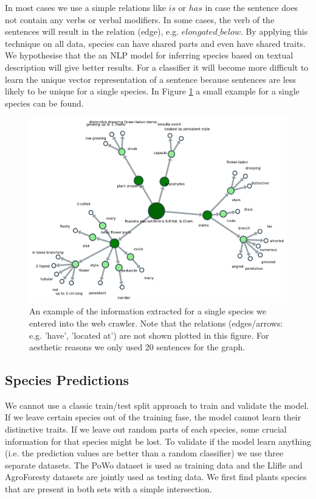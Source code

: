 \documentclass[a4paper, 12pt, oneside]{book} %
\begin{document}
In most cases we use a simple relations like $is$ or $has$ in case the sentence does not contain any verbs or verbal modifiers.
In some cases, the verb of the sentences will result in the relation (edge), e.g. $elongated\_below$.
By applying this technique on all data, species can have shared parts and even have shared traits.
We hypothesise that the an NLP model for inferring species based on textual description will give better results.
For a classifier it will become more difficult to learn the unique vector representation of a sentence because sentences are less likely to be unique for a single species.
In Figure \ref{fig:kngraph_unweighted} a small example for a single species can be found.
\begin{figure} [htpb]
    \centering
    \includegraphics[width=\textwidth]{figures/kngraph_unweighted.pdf}
    \caption[Example of an unweighted knowledge graph]{An example of the information extracted for a single species we entered into the web crawler. Note that the relations (edges/arrows: e.g. 'have', 'located at') are not shown plotted in this figure. For aesthetic reasons we only used 20 sentences for the graph.}
    \label{fig:kngraph_unweighted}
\end{figure}

\subsection{Species Predictions}
We cannot use a classic train/test split approach to train and validate the model.
If we leave certain species out of the training fase, the model cannot learn their distinctive traits.
If we leave out random parts of each species, some crucial information for that species might be lost.
To validate if the model learn anything (i.e. the prediction values are better than a random classifier) we use three separate datasets.
The PoWo dataset is used as training data and the Llifle and AgroForesty datasets are jointly used as testing data.
We first find plants species that are present in both sets with a simple intersection.
\end{document}
